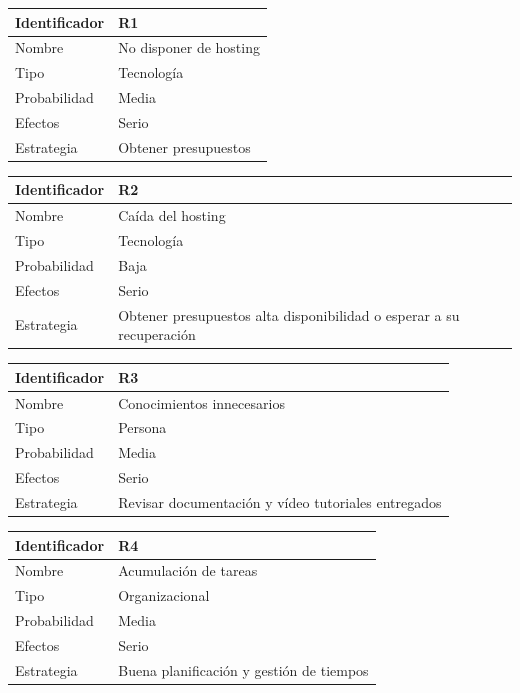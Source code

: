\vspace{1em}
\par
\begin{tabular}{||p{3cm}|p{11cm}||} 
\hline
Identificador & R1 \\ [0.5ex] 
\hline\hline
Nombre & No disponer de hosting \\ 
\hline
Tipo & Tecnología \\
\hline
Probabilidad & Media \\
\hline
Efectos & Serio \\
\hline
Estrategia & Obtener presupuestos \\ [1ex] 
\hline
\end{tabular}

\vspace{1em}
\par
\begin{tabular}{||p{3cm}|p{11cm}||} 
\hline
Identificador & R2 \\ [0.5ex] 
\hline\hline
Nombre & Caída del hosting \\ 
\hline
Tipo & Tecnología \\
\hline
Probabilidad & Baja \\
\hline
Efectos & Serio \\
\hline
Estrategia & Obtener presupuestos alta disponibilidad o esperar a su recuperación \\ [1ex] 
\hline
\end{tabular}

\vspace{1em}
\par
\begin{tabular}{||p{3cm}|p{11cm}||} 
\hline
Identificador & R3 \\ [0.5ex] 
\hline\hline
Nombre & Conocimientos innecesarios \\ 
\hline
Tipo & Persona \\
\hline
Probabilidad & Media \\
\hline
Efectos & Serio \\
\hline
Estrategia & Revisar documentación y vídeo tutoriales entregados \\ [1ex] 
\hline
\end{tabular}

\vspace{1em}
\par
\begin{tabular}{||p{3cm}|p{11cm}||} 
\hline
Identificador & R4 \\ [0.5ex] 
\hline\hline
Nombre & Acumulación de tareas \\ 
\hline
Tipo & Organizacional \\
\hline
Probabilidad & Media \\
\hline
Efectos & Serio \\
\hline
Estrategia & Buena planificación y gestión de tiempos \\ [1ex] 
\hline
\end{tabular}

